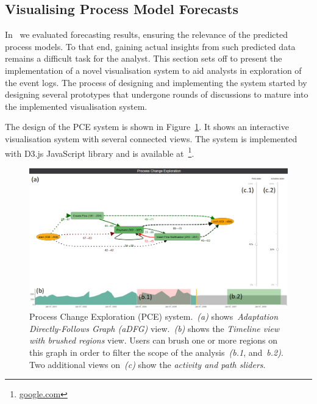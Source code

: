 \subsection{Visualising Process Model Forecasts}\label{sec:visualisation}

In~ we evaluated forecasting results, ensuring the relevance of the predicted process models. To that end, gaining actual insights from such predicted data remains a difficult task for the analyst. This section sets off to present the implementation of a novel visualisation system to aid analysts in exploration of the event logs. The process of designing and implementing the system started by designing several prototypes that undergone rounds of discussions to mature into the implemented visualisation system. 

The design of the PCE system is shown in Figure~\ref{fig:vis-two-brushes}. It shows an interactive visualisation system with several connected views. The system is implemented with D3.js JavaScript library and is available at~\footnote{\url{google.com}}.


\begin{figure}
	\centering
	\includegraphics[width=\textwidth]{img/vis/actual-predicted-two-brushed-regions-system.PNG}
	\caption{Process Change Exploration (PCE) system.~\emph{(a)} shows~\emph{Adaptation Directly-Follows Graph (aDFG)} view.~\emph{(b)} shows the \emph{Timeline view with brushed regions} view. Users can brush one or more regions on this graph in order to filter the scope of the analysis~\emph{(b.1}, and~\emph{b.2)}. Two additional views on~\emph{(c)} show the \emph{activity and path sliders}.} 
	\label{fig:vis-two-brushes}
\end{figure}